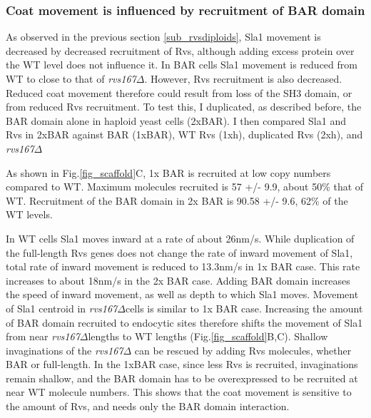 	\subsubsection{Coat movement is influenced by recruitment of BAR domain }
As observed in the previous section  \ref{sub_rvsdiploids}, Sla1 movement is decreased by decreased recruitment of Rvs, although adding excess protein over the WT level does not influence it. In BAR cells Sla1 movement is reduced from WT to close to that of \textit{rvs167$\Delta$}. However, Rvs recruitment is also decreased. Reduced coat movement therefore could result from loss of the SH3 domain, or from reduced Rvs recruitment. To test this, I duplicated, as described before, the BAR domain alone in haploid yeast cells (2xBAR). I then compared Sla1 and Rvs in 2xBAR against BAR (1xBAR), WT Rvs (1xh), duplicated Rvs (2xh), and \textit{rvs167$\Delta$}

	\vspace{5mm}
 As shown in Fig.\ref{fig_scaffold}C, 1x BAR is recruited at low copy numbers compared to WT. Maximum molecules recruited is 57 +/- 9.9, about 50\% that of WT. Recruitment of the BAR domain in 2x BAR is 90.58 +/- 9.6, 62\% of the WT levels. 
 
	\vspace{5mm}
In WT cells Sla1 moves inward at a rate of about 26nm/s. While duplication of the full-length Rvs genes does not change the rate of inward movement of Sla1, total rate of inward movement is reduced to 13.3nm/s in 1x BAR case. This rate increases to about 18nm/s in the 2x BAR case. Adding BAR domain increases the speed of inward movement, as well as depth to which Sla1 moves. Movement of Sla1 centroid in \textit{rvs167$\Delta$}cells is similar to 1x BAR case. Increasing the amount of BAR domain recruited to endocytic sites therefore shifts the movement of Sla1 from near \textit{rvs167$\Delta$}lengths to WT lengths (Fig.\ref{fig_scaffold}B,C).
	\vspace{5mm}
Shallow invaginations of the \textit{rvs167$\Delta$} can be rescued by adding Rvs molecules, whether BAR or full-length. In the 1xBAR case, since less Rvs is recruited, invaginations remain shallow, and the BAR domain has to be overexpressed to be recruited at near WT molecule numbers.
This shows that the coat movement is sensitive to the amount of Rvs, and needs only the BAR domain interaction.



